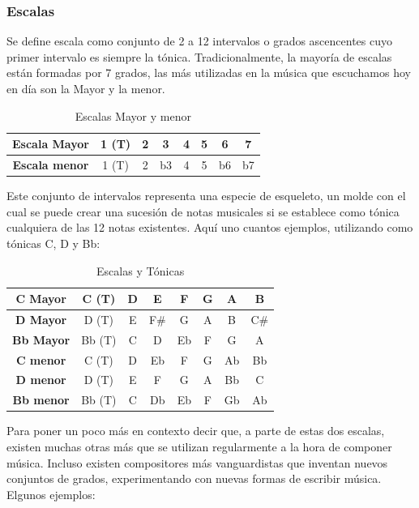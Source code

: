     \subsubsection{Escalas}\label{sec:arm:escalas}

    Se define escala como conjunto de 2 a 12 intervalos o grados ascencentes cuyo primer intervalo es siempre la tónica. Tradicionalmente, la mayoría de escalas están formadas por 7 grados, las más utilizadas en la música que escuchamos hoy en día son la Mayor y la menor.

\begin{table}[h]
    \centering
    \begin{tabular}{c|c|c|c|c|c|c|c}
        \textbf{Escala Mayor} & 1 (T) & 2 & 3 & 4 & 5 & 6 & 7 \\
        \hline
        \hline
        \textbf{Escala menor} & 1 (T) & 2 & b3 & 4 & 5 & b6 & b7 \\
    \end{tabular}
    \caption{Escalas Mayor y menor}
    \label{tab:escalas}
\end{table}

    Este conjunto de intervalos representa una especie de esqueleto, un molde con el cual se puede crear una sucesión de notas musicales si se establece como tónica cualquiera de las 12 notas existentes. Aquí uno cuantos  ejemplos, utilizando como tónicas C, D y Bb:

\begin{table}[h]
    \centering
    \begin{tabular}{c|c|c|c|c|c|c|c}
        \textbf{C Mayor} & C (T) & D & E & F & G & A & B \\
        \hline
        \textbf{D Mayor} & D (T) & E & F\# & G & A & B & C\# \\
        \hline
        \textbf{Bb Mayor} & Bb (T) & C & D & Eb & F & G & A \\
        \hline
        \hline
        \textbf{C menor} & C (T) & D & Eb & F & G & Ab & Bb \\
        \hline
        \textbf{D menor} & D (T) & E & F & G & A & Bb & C \\
        \hline
        \textbf{Bb menor} & Bb (T) & C & Db & Eb & F & Gb & Ab \\
    \end{tabular}
    \caption{Escalas y Tónicas}
    \label{tab:escalas_tonicas}
\end{table}

    Para poner un poco más en contexto decir que, a parte de estas dos escalas, existen muchas otras más que se utilizan regularmente a la hora de componer música. Incluso existen compositores más vanguardistas que inventan nuevos conjuntos de grados, experimentando con nuevas formas de escribir música. Elgunos ejemplos: 

